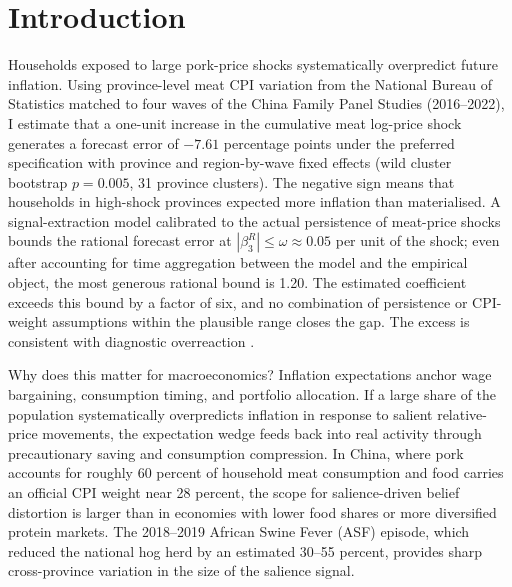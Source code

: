 \section{Introduction}\label{sec:intro}

Households exposed to large pork-price shocks systematically
overpredict future inflation.
Using province-level meat CPI variation from the National Bureau
of Statistics matched to four waves of the China Family Panel
Studies (2016--2022), I estimate that a one-unit increase in
the cumulative meat log-price shock generates a forecast error
of $-7.61$ percentage points under the preferred specification
with province and region-by-wave fixed effects (wild cluster
bootstrap $p = 0.005$, 31 province clusters).
The negative sign means that households in high-shock provinces
expected more inflation than materialised.
A signal-extraction model calibrated to the actual persistence
of meat-price shocks bounds the rational forecast error at
$|\beta_3^R| \leq \omega \approx 0.05$ per unit of the shock;
even after accounting for time aggregation between the model
and the empirical object, the most generous rational bound
is 1.20.
The estimated coefficient exceeds this bound by a factor of
six, and no combination of persistence or CPI-weight
assumptions within the plausible range closes the gap.
The excess is consistent with diagnostic overreaction
\citep{Bordalo2018, Bordalo2020b}.

Why does this matter for macroeconomics?
Inflation expectations anchor wage bargaining, consumption
timing, and portfolio allocation.
If a large share of the population systematically overpredicts
inflation in response to salient relative-price movements, the
expectation wedge feeds back into real activity through
precautionary saving and consumption compression.
In China, where pork accounts for roughly 60 percent of
household meat consumption and food carries an official CPI
weight near 28 percent, the scope for salience-driven belief
distortion is larger than in economies with lower food shares
or more diversified protein markets.
The 2018--2019 African Swine Fever (ASF) episode, which reduced
the national hog herd by an estimated 30--55 percent, provides
sharp cross-province variation in the size of the salience
signal.

